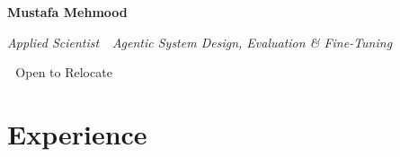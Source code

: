 \documentclass[10.5pt, letterpaper]{article}
\newenvironment{header}{
    \setlength{\topsep}{0pt}\par\kern\topsep\centering\linespread{1.15}
}{
    \par\kern\topsep
} %
\newcommand{\placelastupdatedtext}{%
  \AddToShipoutPictureFG*{%
    \put(
        \LenToUnit{\paperwidth-2 cm-0.2 cm+0.05cm},
        \LenToUnit{\paperheight-1.0 cm}
    )
  }%
}%
\let\hrefWithoutArrow\href
\renewcommand{\href}[2]{\hrefWithoutArrow{#1}{\ifthenelse{\equal{#2}{}}{ }{#2 }\raisebox{.15ex}{\footnotesize \faExternalLink*}}}
\begin{document}
    
    \newcommand{\AND}{\unskip
        \cleaders\copy\ANDbox\hskip\wd\ANDbox
        \ignorespaces
    }
    \newsavebox\ANDbox
    \sbox\ANDbox{}

    \placelastupdatedtext
    \begin{header}
    \textbf{\fontsize{18 pt}{18 pt}\selectfont Mustafa Mehmood}

    \vspace{0.01 cm}

    {\normalsize\textit{Applied Scientist \,\textperiodcentered\, Agentic System Design, Evaluation \& Fine-Tuning}}

    \normalsize
    
    \mbox{\hrefWithoutArrow{mailto:mustafamehmood8998@gmail.com}{\color{black}{mustafamehmood8998@gmail.com}}}
    \textbf{\,\textperiodcentered\,}
    {Open to Relocate}
    \textbf{\,\textperiodcentered\,}
    \mbox{\hrefWithoutArrow{tel:+44-7769-504-569}{\color{black}{+44 7769 504 569}}}
    \textbf{\,\textperiodcentered\,}
    \mbox{\hrefWithoutArrow{https://mustafamehmood.vercel.app/}{\color{black}{Website}}}
    \textbf{\,\textperiodcentered\,}
    \mbox{\hrefWithoutArrow{https://www.linkedin.com/in/mustafa-meh}{\color{black}{LinkedIn}}}
    \textbf{\,\textperiodcentered\,}
    \mbox{\hrefWithoutArrow{https://github.com/mustafameh}{\color{black}{GitHub }}}
    
\end{header}

\fontsize{10.2}{11.2}\selectfont

\section{Experience}

\vspace{0.05 cm}
\end{document}
